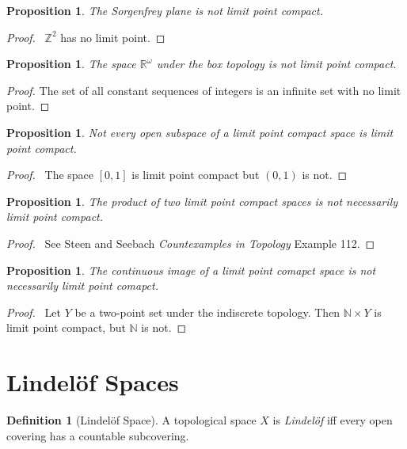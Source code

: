 \documentclass{report}
\let\qed\relax
\newtheorem{prop}[lm]{Proposition}
\theoremstyle{definition}
\newtheorem{df}[lm]{Definition}
\begin{document}
  \begin{prop}
  The Sorgenfrey plane is not limit point compact.
 \end{prop}

 \begin{proof}
   \pf\ $\mathbb{Z}^2$ has no limit point. \qed
 \end{proof}

  \begin{prop}
   The space $\mathbb{R}^\omega$ under the box topology is not limit point
compact.
 \end{prop}

 \begin{proof}
  \pf The set of all constant sequences of integers is an infinite set with no
limit point. \qed
 \end{proof}

 \begin{prop}
   Not every open subspace of a limit point compact space is limit point compact.
 \end{prop}

 \begin{proof}
   \pf\ The space $[0,1]$ is limit point compact but $(0,1)$ is not. \qed
 \end{proof}

 \begin{prop}
   The product of two limit point compact spaces is not necessarily limit point compact.
 \end{prop}

 \begin{proof}
   \pf\ See Steen and Seebach \emph{Countexamples in Topology} Example 112. \qed
 \end{proof}

 \begin{prop}
   The continuous image of a limit point comapct space is not necessarily limit point comapct.
 \end{prop}

 \begin{proof}
   \pf\ Let $Y$ be a two-point set under the indiscrete topology. Then $\mathbb{N}
   \times Y$ is limit point compact, but $\mathbb{N}$ is not. \qed
 \end{proof}

  \section{Lindel\"{o}f Spaces}

    \begin{df}[Lindel\"{o}f Space]
    A topological space $X$ is \emph{Lindel\"{o}f} iff every open covering has
    a countable subcovering.
  \end{df}
\end{document}
